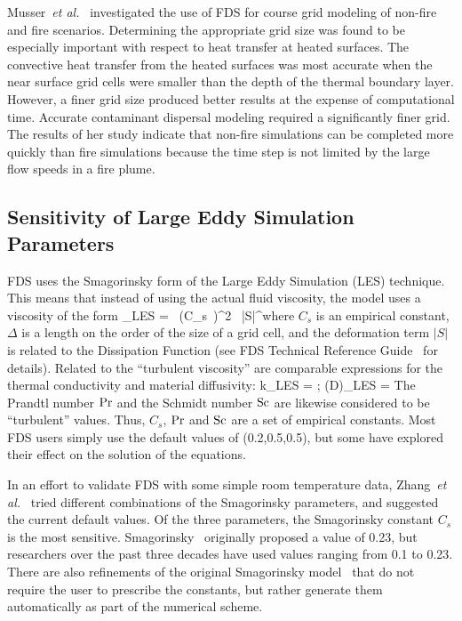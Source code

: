 \documentclass[11pt]{book}
\begin{document}
Musser~{\em et  al.}~\cite{Musser:1} investigated  the use of  FDS for course grid  modeling of non-fire and fire  scenarios. Determining the
appropriate  grid  size was  found  to  be  especially important  with respect  to heat  transfer  at heated  surfaces.  The convective  heat
transfer  from the  heated surfaces  was most  accurate when  the near surface grid cells were smaller than the depth of the thermal boundary layer.
However, a  finer grid  size  produced better  results at  the expense of computational time. Accurate contaminant dispersal modeling required a
significantly finer grid. The results of her study indicate that  non-fire simulations  can be  completed more  quickly  than fire simulations
because  the time  step is not  limited by the  large flow speeds in a fire plume.


\subsection{Sensitivity of Large Eddy Simulation Parameters}

FDS  uses the  Smagorinsky form  of  the Large  Eddy Simulation  (LES) technique.  This  means  that   instead  of  using  the  actual  fluid
viscosity, the model uses a viscosity of the form \be \mu_{\hbox{\tiny LES}} =  \rho \,  (C_s\, \Delta)^2  \, |S|^\ha \ee  where $C_s$  is an
empirical constant, $\Delta$ is a length on the order of the size of a grid  cell,  and  the  deformation   term  $|S|$  is  related  to  the
Dissipation Function (see FDS Technical Reference Guide~\cite{FDS_Tech_Guide_5} for details). Related to the ``turbulent  viscosity'' are  comparable
expressions  for  the thermal conductivity  and  material diffusivity:  \be  k_{\hbox{\tiny LES}}  = 
\quad   ;  \quad  (\rho D)_{\hbox{\tiny  LES}}  =  \ee  The Prandtl  number  $\hbox{Pr}$  and  the  Schmidt number
$\hbox{Sc}$  are  likewise considered to  be ``turbulent'' values.  Thus, $C_s$, $\hbox{Pr}$  and $\hbox{Sc}$ are  a set  of  empirical constants.  Most  FDS users
simply use  the default values  of (0.2,0.5,0.5), but some have  explored their effect on the solution of the equations.

In an effort  to validate FDS with some  simple room temperature data, Zhang~{\em et al.}~\cite{Zhang:2}  tried different combinations of the
Smagorinsky parameters,  and suggested the current  default values. Of the  three parameters,  the  Smagorinsky constant  $C_s$  is the  most
sensitive.   Smagorinsky~\cite{Smagorinsky:1}  originally  proposed  a value of 0.23,  but researchers over the past  three decades have used values
ranging  from 0.1  to 0.23. There  are also refinements  of the original  Smagorinsky  model~\cite{Deardorff:1,Germano:1,Lilly:1} that do  not
require the  user  to  prescribe  the constants,  but  rather generate them automatically as part of the numerical scheme.
\end{document}
